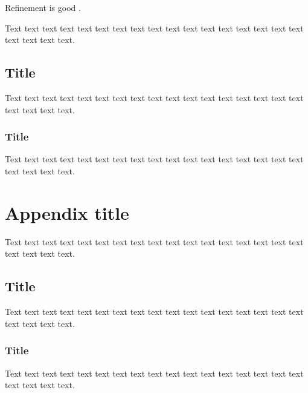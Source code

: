\documentclass[preprint]{iucr}              %
\begin{document}
Refinement is good \cite{Waterman2016}.

Text text text text text text text text text text text text text text
text text text text text text text.

\subsection{Title}

Text text text text text text text text text text text text text text
text text text text text text text.

\subsubsection{Title}

Text text text text text text text text text text text text text text
text text text text text text text.



\appendix
\section{Appendix title}

Text text text text text text text text text text text text text text
text text text text text text text.

\subsection{Title}

Text text text text text text text text text text text text text text
text text text text text text text.

\subsubsection{Title}

Text text text text text text text text text text text text text text
text text text text text text text.



\end{document}
